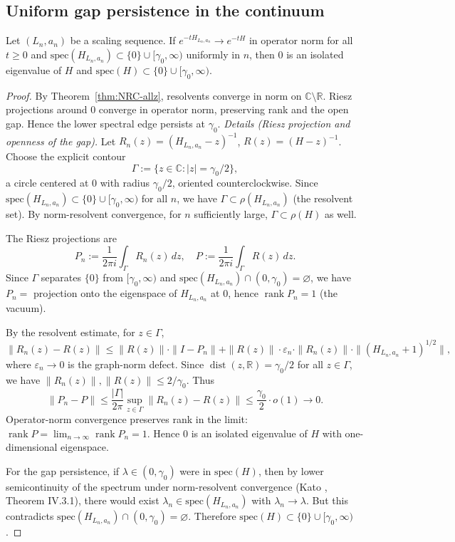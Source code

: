 \documentclass[11pt]{amsart}
\begin{document}
\subsection*{Uniform gap persistence in the continuum}

\begin{theorem}\label{thm:gap-persist}
Let $(L_n,a_n)$ be a scaling sequence. If $e^{-tH_{L_n,a_n}}\to e^{-tH}$ in operator norm for all $t\ge 0$ and $\mathrm{spec}(H_{L_n,a_n})\subset\{0\}\cup[\gamma_0,\infty)$ uniformly in $n$, then $0$ is an isolated eigenvalue of $H$ and $\mathrm{spec}(H)\subset\{0\}\cup[\gamma_0,\infty)$.
\end{theorem}

\begin{proof}
By Theorem~\ref{thm:NRC-allz}, resolvents converge in norm on $\mathbb C\setminus\mathbb R$. Riesz projections around $0$ converge in operator norm, preserving rank and the open gap. Hence the lower spectral edge persists at $\gamma_0$.
\smallskip
\noindent\emph{Details (Riesz projection and openness of the gap).} Let $R_n(z)=(H_{L_n,a_n}-z)^{-1}$, $R(z)=(H-z)^{-1}$. Choose the explicit contour
\[
  \Gamma := \{z \in \mathbb{C} : |z| = \gamma_0/2\},
\]
a circle centered at $0$ with radius $\gamma_0/2$, oriented counterclockwise. Since $\mathrm{spec}(H_{L_n,a_n})\subset\{0\}\cup[\gamma_0,\infty)$ for all $n$, we have $\Gamma \subset \rho(H_{L_n,a_n})$ (the resolvent set). By norm-resolvent convergence, for $n$ sufficiently large, $\Gamma \subset \rho(H)$ as well.

The Riesz projections are
\[
  P_n := \frac{1}{2\pi i}\int_\Gamma R_n(z)\,dz, \quad P := \frac{1}{2\pi i}\int_\Gamma R(z)\,dz.
\]
Since $\Gamma$ separates $\{0\}$ from $[\gamma_0,\infty)$ and $\mathrm{spec}(H_{L_n,a_n})\cap(0,\gamma_0)=\varnothing$, we have $P_n = $ projection onto the eigenspace of $H_{L_n,a_n}$ at $0$, hence $\operatorname{rank} P_n = 1$ (the vacuum).

By the resolvent estimate, for $z \in \Gamma$,
\[
  \|R_n(z) - R(z)\| \le \|R(z)\| \cdot \|I - P_n\| + \|R(z)\| \cdot \varepsilon_n \cdot \|R_n(z)\| \cdot \|(H_{L_n,a_n}+1)^{1/2}\|,
\]
where $\varepsilon_n \to 0$ is the graph-norm defect. Since $\operatorname{dist}(z,\mathbb{R}) = \gamma_0/2$ for all $z \in \Gamma$, we have $\|R_n(z)\|, \|R(z)\| \le 2/\gamma_0$. Thus
\[
  \|P_n - P\| \le \frac{|\Gamma|}{2\pi} \sup_{z \in \Gamma} \|R_n(z) - R(z)\| \le \frac{\gamma_0}{2} \cdot o(1) \to 0.
\]
Operator-norm convergence preserves rank in the limit: $\operatorname{rank} P = \lim_{n\to\infty} \operatorname{rank} P_n = 1$. Hence $0$ is an isolated eigenvalue of $H$ with one-dimensional eigenspace.

For the gap persistence, if $\lambda \in (0,\gamma_0)$ were in $\mathrm{spec}(H)$, then by lower semicontinuity of the spectrum under norm-resolvent convergence (Kato \cite{Kato1995}, Theorem IV.3.1), there would exist $\lambda_n \in \mathrm{spec}(H_{L_n,a_n})$ with $\lambda_n \to \lambda$. But this contradicts $\mathrm{spec}(H_{L_n,a_n}) \cap (0,\gamma_0) = \varnothing$. Therefore $\mathrm{spec}(H) \subset \{0\} \cup [\gamma_0,\infty)$.
\end{proof}
\end{document}
